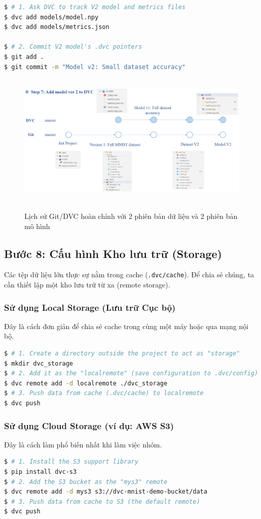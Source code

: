 \documentclass[11pt]{article}
\begin{document}
\begin{lstlisting}[language=bash]
$ # 1. Ask DVC to track V2 model and metrics files
$ dvc add models/model.npy
$ dvc add models/metrics.json

$ # 2. Commit V2 model's .dvc pointers
$ git add .
$ git commit -m "Model v2: Small dataset accuracy"
\end{lstlisting}

\begin{figure}[H]
    \centering
    \includegraphics[width=0.7\linewidth]{images/p18.png}
    \caption{Lịch sử Git/DVC hoàn chỉnh với 2 phiên bản dữ liệu và 2 phiên bản mô hình}
\end{figure}

\subsection{Bước 8: Cấu hình Kho lưu trữ (Storage)}
Các tệp dữ liệu lớn thực sự nằm trong cache (\texttt{.dvc/cache}). Để chia sẻ chúng, ta cần thiết lập một kho lưu trữ từ xa (remote storage).

\subsubsection{Sử dụng Local Storage (Lưu trữ Cục bộ)}
Đây là cách đơn giản để chia sẻ cache trong cùng một máy hoặc qua mạng nội bộ.
\begin{lstlisting}[language=bash]
$ # 1. Create a directory outside the project to act as "storage"
$ mkdir dvc_storage
$ # 2. Add it as the "localremote" (save configuration to .dvc/config)
$ dvc remote add -d localremote ./dvc_storage
$ # 3. Push data from cache (.dvc/cache) to localremote
$ dvc push
\end{lstlisting}

\subsubsection{Sử dụng Cloud Storage (ví dụ: AWS S3)}
Đây là cách làm phổ biến nhất khi làm việc nhóm.
\begin{lstlisting}[language=bash]
$ # 1. Install the S3 support library
$ pip install dvc-s3
$ # 2. Add the S3 bucket as the "mys3" remote
$ dvc remote add -d mys3 s3://dvc-mnist-demo-bucket/data
$ # 3. Push data from cache to S3 (the default remote)
$ dvc push
\end{lstlisting}
\end{document}
